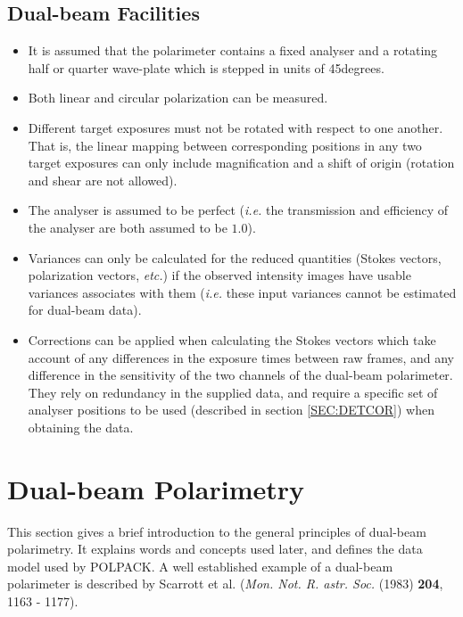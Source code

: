 \documentclass[twoside,11pt]{article}
\newcommand{\hyperref}[4]{#2\ref{#4}#3}
\newcommand{\xlabel}[1]{}
\renewcommand{\_}{\texttt{\symbol{95}}}
\newcommand{\dgs}{\hbox{$^\circ$}}
\renewcommand{\dgs}{degrees}
\begin{document}
\subsection{Dual-beam Facilities}

\begin{itemize}

\item It is assumed that the polarimeter contains a fixed analyser and a
rotating half or quarter wave-plate which is stepped in units of 45\dgs. 

\item Both linear and circular polarization can be measured. 

\item Different target exposures must not be rotated with respect to one
another. That is, the linear mapping between corresponding positions in any two target 
exposures can only include magnification and a shift of origin (rotation 
and shear are not allowed).

\item The analyser is assumed to be perfect (\emph{i.e.} the transmission and
efficiency of the analyser are both assumed to be $1.0$).

\item Variances can only be calculated for the reduced quantities (Stokes
vectors, polarization vectors, \emph{etc.}) if the observed intensity
images have usable variances associates with them (\emph{i.e.} these
input variances cannot be estimated for dual-beam data).

\item Corrections can be applied when calculating the Stokes vectors which
take account of any differences in the exposure times between raw frames,
and any difference in the sensitivity of the two channels of the
dual-beam polarimeter. They rely on redundancy in the supplied data, and
require a specific set of analyser positions to be used (described
\hyperref{here}{in section }{} {SEC:DETCOR}) when obtaining the data.

\end{itemize}

\section{\label{SEC:DBPOL}\xlabel{dualbeampolarimetry}Dual-beam Polarimetry}
This section gives a brief introduction to the general principles of
dual-beam polarimetry. It explains words and concepts used later, and
defines the data model used by POLPACK. A well established example of a
dual-beam polarimeter is described by Scarrott et al. (\emph{Mon. Not. R.
astr. Soc.} (1983) \textbf{204}, 1163 - 1177).
\end{document}
